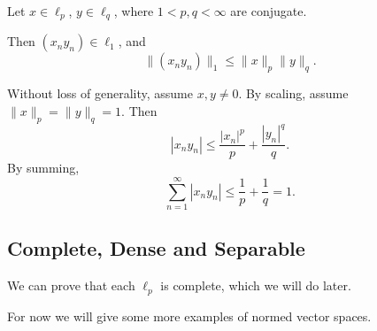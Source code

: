 \documentclass[12pt]{article}
\begin{document}
\begin{theorem}
	Let $x \in \ell_p$, $y \in \ell_q$, where $1 < p, q < \infty$ are conjugate.

	Then $(x_ny_n) \in \ell_1$, and
	\[
	\|(x_ny_n)\|_1 \leq \|x\|_p \|y\|_q.
	\]
\end{theorem}

\begin{proofbox}
	Without loss of generality, assume $x, y \neq 0$. By scaling, assume $\|x\|_p = \|y\|_q = 1$. Then
	\[
	|x_n y_n| \leq \frac{|x_n|^p}{p} + \frac{|y_n|^q}{q}.
	\]
	By summing,
	\[
	\sum_{n = 1}^{\infty}|x_ny_n| \leq \frac{1}{p} + \frac1q = 1.
	\]
\end{proofbox}

\subsection{Complete, Dense and Separable}
\label{sub:cds}

We can prove that each $\ell_p$ is complete, which we will do later.

For now we will give some more examples of normed vector spaces.
\end{document}
